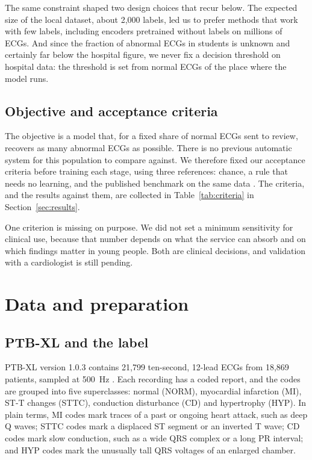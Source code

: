 \documentclass[letterpaper,11pt]{article}
\begin{document}
The same constraint shaped two design choices that recur below. The expected size of the local dataset, about 2,000 labels, led us to prefer methods that work with few labels, including encoders pretrained without labels on millions of ECGs. And since the fraction of abnormal ECGs in students is unknown and certainly far below the hospital figure, we never fix a decision threshold on hospital data: the threshold is set from normal ECGs of the place where the model runs.

\subsection{Objective and acceptance criteria}

The objective is a model that, for a fixed share of normal ECGs sent to review, recovers as many abnormal ECGs as possible. There is no previous automatic system for this population to compare against. We therefore fixed our acceptance criteria before training each stage, using three references: chance, a rule that needs no learning, and the published benchmark on the same data \parencite{strodthoff2021deep}. The criteria, and the results against them, are collected in Table~\ref{tab:criteria} in Section~\ref{sec:results}.

One criterion is missing on purpose. We did not set a minimum sensitivity for clinical use, because that number depends on what the service can absorb and on which findings matter in young people. Both are clinical decisions, and validation with a cardiologist is still pending.

\section{Data and preparation}

\subsection{PTB-XL and the label}
\label{sec:label}

PTB-XL version 1.0.3 contains 21,799 ten-second, 12-lead ECGs from 18,869 patients, sampled at 500~Hz \parencite{wagner2020ptbxl}. Each recording has a coded report, and the codes are grouped into five superclasses: normal (NORM), myocardial infarction (MI), ST-T changes (STTC), conduction disturbance (CD) and hypertrophy (HYP). In plain terms, MI codes mark traces of a past or ongoing heart attack, such as deep Q waves; STTC codes mark a displaced ST segment or an inverted T wave; CD codes mark slow conduction, such as a wide QRS complex or a long PR interval; and HYP codes mark the unusually tall QRS voltages of an enlarged chamber.
\end{document}
